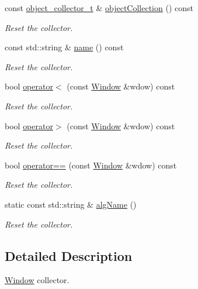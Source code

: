 \begin{DoxyCompactItemize}
const \hyperlink{classSlidingWindow_1_1Window_a3883a474287703a42cf8971ba8ef6884}{object\+\_\+collector\+\_\+t} \& \hyperlink{classSlidingWindow_1_1Window_a6739836c037dab15b40402e9b843e596}{object\+Collection} () const 
\begin{DoxyCompactList}\small\item\em Reset the collector. \end{DoxyCompactList}\item 
const std\+::string \& \hyperlink{classSlidingWindow_1_1Window_a6e73fa686560987efd9f6638f21ce498}{name} () const 
\begin{DoxyCompactList}\small\item\em Reset the collector. \end{DoxyCompactList}\item 
bool \hyperlink{classSlidingWindow_1_1Window_a9dda3fd75fd3a0c4e9100ab7b265b5fa}{operator$<$} (const \hyperlink{classSlidingWindow_1_1Window}{Window} \&wdow) const 
\begin{DoxyCompactList}\small\item\em Reset the collector. \end{DoxyCompactList}\item 
bool \hyperlink{classSlidingWindow_1_1Window_a67c4b776bbfa88884d034ffe8e482c90}{operator$>$} (const \hyperlink{classSlidingWindow_1_1Window}{Window} \&wdow) const 
\begin{DoxyCompactList}\small\item\em Reset the collector. \end{DoxyCompactList}\item 
bool \hyperlink{classSlidingWindow_1_1Window_a2f875343fe56bd7640fa35ecc047232e}{operator==} (const \hyperlink{classSlidingWindow_1_1Window}{Window} \&wdow) const 
\begin{DoxyCompactList}\small\item\em Reset the collector. \end{DoxyCompactList}\item 
static const std\+::string \& \hyperlink{classSlidingWindow_1_1Window_a545617bc70be6e22a50e79d147eb3c75}{alg\+Name} ()
\begin{DoxyCompactList}\small\item\em Reset the collector. \end{DoxyCompactList}\end{DoxyCompactItemize}


\subsection{Detailed Description}
\hyperlink{classSlidingWindow_1_1Window}{Window} collector. 

